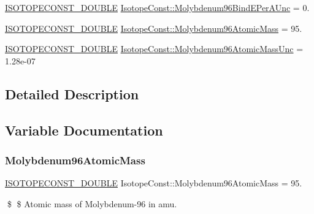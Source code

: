 \begin{DoxyCompactItemize}
\mbox{\hyperlink{group___isotope_const-_macros_ga8f45a7272ce02c0b4c65c44636ed719a}{I\+S\+O\+T\+O\+P\+E\+C\+O\+N\+S\+T\+\_\+\+D\+O\+U\+B\+LE}} \mbox{\hyperlink{group___isotope_const-_molybdenum-_mo96_ga56c93890aacb5bba50c4d33c8536c2d3}{Isotope\+Const\+::\+Molybdenum96\+Bind\+E\+Per\+A\+Unc}} = 0.
\item 
\mbox{\hyperlink{group___isotope_const-_macros_ga8f45a7272ce02c0b4c65c44636ed719a}{I\+S\+O\+T\+O\+P\+E\+C\+O\+N\+S\+T\+\_\+\+D\+O\+U\+B\+LE}} \mbox{\hyperlink{group___isotope_const-_molybdenum-_mo96_ga3d975c3ed39020d857307f2664003257}{Isotope\+Const\+::\+Molybdenum96\+Atomic\+Mass}} = 95.
\item 
\mbox{\hyperlink{group___isotope_const-_macros_ga8f45a7272ce02c0b4c65c44636ed719a}{I\+S\+O\+T\+O\+P\+E\+C\+O\+N\+S\+T\+\_\+\+D\+O\+U\+B\+LE}} \mbox{\hyperlink{group___isotope_const-_molybdenum-_mo96_ga20c075f8e06c718d7191025276a7130a}{Isotope\+Const\+::\+Molybdenum96\+Atomic\+Mass\+Unc}} = 1.\+28e-\/07
\end{DoxyCompactItemize}


\subsection{Detailed Description}


\subsection{Variable Documentation}
\mbox{\label{group___isotope_const-_molybdenum-_mo96_ga3d975c3ed39020d857307f2664003257}} 
\subsubsection{\texorpdfstring{Molybdenum96\+Atomic\+Mass}{Molybdenum96AtomicMass}}
{\footnotesize\ttfamily \mbox{\hyperlink{group___isotope_const-_macros_ga8f45a7272ce02c0b4c65c44636ed719a}{I\+S\+O\+T\+O\+P\+E\+C\+O\+N\+S\+T\+\_\+\+D\+O\+U\+B\+LE}} Isotope\+Const\+::\+Molybdenum96\+Atomic\+Mass = 95.}

\$ \$ Atomic mass of Molybdenum-\/96 in amu. \mbox{\label{group___isotope_const-_molybdenum-_mo96_ga20c075f8e06c718d7191025276a7130a}} 
